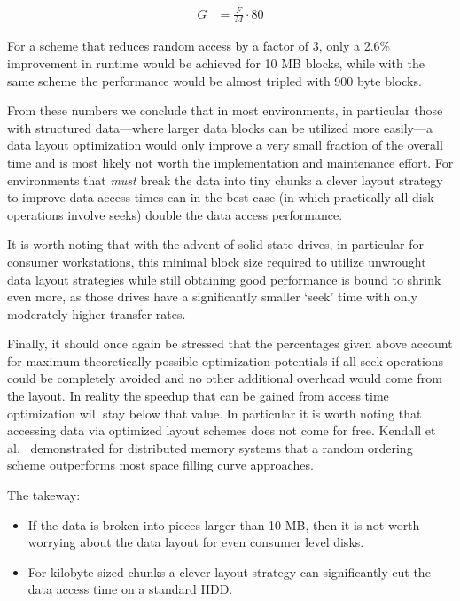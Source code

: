 \begin{align*}
G  &=   \frac{F}{M} \cdot 80
\end{align*}

For a scheme that reduces random access by a factor of 3, only a 2.6\%
improvement in runtime would be achieved for 10 MB blocks, while with the same scheme
the performance would be almost tripled with 900 byte blocks.

From these numbers we conclude that in most environments, in particular
those with structured data---where larger data blocks can be
utilized more easily---a data layout optimization would only improve
a very small fraction of the overall time and is most likely not worth
the implementation and
maintenance effort. For environments that \emph{must} break the data into
tiny chunks a clever layout strategy to improve data access times can in the
best case (in which practically all disk operations involve seeks) double the
data access performance.


It is worth noting that with the advent of solid state drives, in
particular for consumer workstations, this minimal block size required
to utilize unwrought data layout strategies while still obtaining
good performance is bound to shrink even more, as those drives have a
significantly smaller `seek' time with only moderately higher transfer
rates.

Finally, it should once again be stressed that the percentages
given above account for maximum theoretically possible optimization
potentials if all seek operations could be completely avoided and no
other additional overhead would come from the layout.  In reality the
speedup that can be gained from access time optimization will stay
below that value. In particular it is worth noting that accessing data
via optimized layout schemes does not come
for free. Kendall et al.~\cite{Kendall:2009:TDO} demonstrated for
distributed memory systems that a random ordering scheme outperforms
most space filling curve approaches.

The takeway:

\begin{itemize}
  \item If the data is broken into pieces larger than 10 MB, then it
  is not worth worrying about the data layout for even consumer level
  disks.
  \item For kilobyte sized chunks a clever layout strategy can
           significantly cut the data access time on a standard HDD.
\end{itemize}

